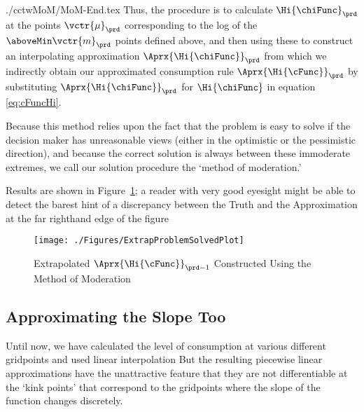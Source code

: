 \documentclass[\econtexRoot/SolvingMicroDSOPs]{subfiles}
\begin{document}
\mu 
\begin{verbatimwrite}{./cctwMoM/MoM-End.tex}
  Thus, the procedure is to calculate $\Hi{\chiFunc}_{\prd}$ at the points
  $\vctr{\mu}_{\prd}$ corresponding to the log of the $\aboveMin
  \vctr{m}_{\prd}$ points defined above, and then using these to construct an
  interpolating approximation $\Aprx{\Hi{\chiFunc}}_{\prd}$ from which we indirectly obtain our
  approximated consumption rule $\Aprx{\Hi{\cFunc}}_{\prd}$ by substituting $\Aprx{\Hi{\chiFunc}}_{\prd}$ for $\Hi{\chiFunc}$ in equation \eqref{eq:cFuncHi}.

  Because this method relies upon the fact that the problem is easy to
  solve if the decision maker has unreasonable views (either in the
  optimistic or the pessimistic direction), and because the correct
  solution is always between these immoderate extremes, we call our
  solution procedure the `method of moderation.'

  Results are shown in Figure~\ref{fig:ExtrapProblemSolved}; a reader
  with very good eyesight might be able to detect the barest hint of a
  discrepancy between the Truth and the Approximation at the far
  righthand edge of the figure
  \hypertarget{ExtrapProblemSolvedPlot}{}
  \begin{figure}
    \texttt{[image: ./Figures/ExtrapProblemSolvedPlot]}
    \caption{Extrapolated $\Aprx{\Hi{\cFunc}}_{\prd-1}$ Constructed Using the Method of Moderation}
    \label{fig:ExtrapProblemSolved}
  \end{figure}
\end{verbatimwrite}
\unskip

\hypertarget{approximating-the-slope-too}{}
\subsection{Approximating the Slope Too}


Until now, we have calculated the level of consumption at various different gridpoints and used linear interpolation  But the resulting piecewise linear approximations have the unattractive feature that they are not differentiable at the `kink points' that correspond to the gridpoints where the slope of the function changes discretely.
\end{document}
